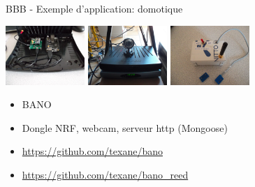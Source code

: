 \documentclass{beamer}
\begin{document}
\begin{frame}{BBB - Exemple d'application: domotique}

  \begin{center}
    \includegraphics[width=30mm]{./pic/bano_inside.jpg}
    \hspace{2.00mm}
    \includegraphics[width=30mm]{./pic/bano_outside.jpg}
    \hspace{2.00mm}
    \includegraphics[width=30mm]{pic/bano_reed.jpg}
  \end{center}

  \begin{small}
    \begin{itemize}
    \item BANO
    \item Dongle NRF, webcam, serveur http (Mongoose)
    \item \url{https://github.com/texane/bano}
    \item \url{https://github.com/texane/bano_reed}
    \end{itemize}
  \end{small}

\end{frame}
\end{document}
